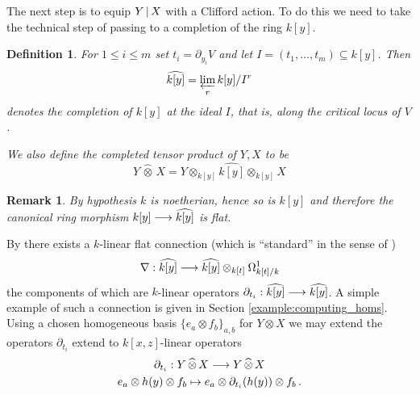 \documentclass[english,letter paper,12pt,leqno]{article}
\theoremstyle{example}
\newtheorem{definition}[theorem]{Definition}
\newtheorem{remark}[theorem]{Remark}
\numberwithin{equation}{section}
\begin{document}
The next step is to equip $Y \,|\, X$ with a Clifford action. To do this we need to take the technical step of passing to a completion of the ring $k[y]$.

\begin{definition} For $1 \le i \le m$ set $t_i = \partial_{y_i} V$ and let $I = (t_1,\ldots,t_m) \subseteq k[y]$. Then
\[
\widehat{k[y]} = \varprojlim_r k[y]/I^r
\]
denotes the completion of $k[y]$ at the ideal $I$, that is, along the critical locus of $V$.

We also define the completed tensor product of $Y, X$ to be
\begin{equation}\label{eq:completed_tensor_product}
Y \,\widehat{\otimes}\, X = Y \otimes_{k[y]} \widehat{k[y]} \otimes_{k[y]} X
\end{equation}
\end{definition} 

\begin{remark}\label{remark:flatness} By hypothesis $k$ is noetherian, hence so is $k[y]$ and therefore the canonical ring morphism $k[y] \longrightarrow \widehat{k[y]}$ is flat. 
\end{remark}

By \cite[Appendix B]{dm1102.2957} there exists a $k$-linear flat connection (which is ``standard'' in the sense of \cite[Definition 8.6]{dm1102.2957})
\begin{equation}\label{eq:connection_nabla}
\nabla: \widehat{k[y]} \longrightarrow \widehat{k[y]} \otimes_{k[t]} \Omega^1_{k[t]/k}
\end{equation}
the components of which are $k$-linear operators $\partial_{t_i}: \widehat{k[y]} \longrightarrow \widehat{k[y]}$. A simple example of such a connection is given in Section \ref{example:computing_homs}. Using a chosen homogeneous basis $\{ e_a \otimes f_b \}_{a,b}$ for $Y \otimes X$ we may extend the operators $\partial_{t_i}$ extend to $k[x,z]$-linear operators
\begin{gather*}
\partial_{t_i}: Y \, \widehat{\otimes}\, X \longrightarrow Y \, \widehat{\otimes}\, X\\
e_a \otimes h(y) \otimes f_b \mapsto e_a \otimes \partial_{t_i}( h(y) ) \otimes f_b\,.
\end{gather*}
\end{document}
